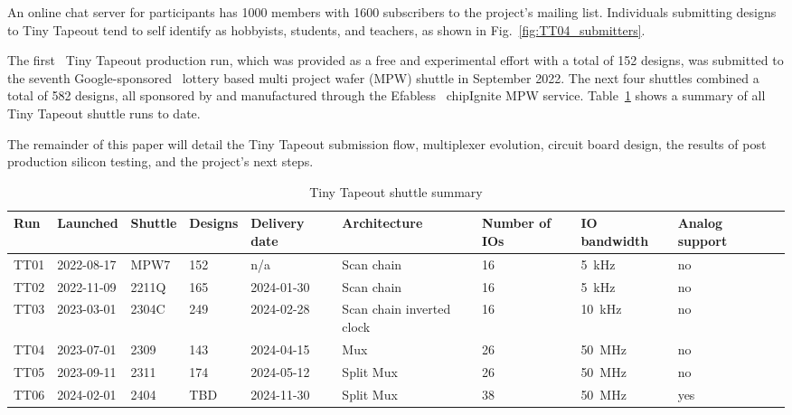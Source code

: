 An online chat server for participants has 1000 members with 1600 subscribers to the project's mailing list. Individuals submitting designs to Tiny Tapeout tend to self identify as hobbyists, students, and teachers, as shown in Fig.~\ref{fig:TT04_submitters}.

The first~\cite{firstshuttle} Tiny Tapeout production run, which was provided as a free and experimental effort with a total of 152 designs, was submitted to the seventh Google-sponsored~\cite{googlesponsored} lottery based multi project wafer (MPW) shuttle in September 2022.
The next four shuttles combined a total of 582 designs, all sponsored by and manufactured through the Efabless~\cite{efabless} chipIgnite MPW service. Table~\ref{tab:tinytapeout} shows a summary of all Tiny Tapeout shuttle runs to date.

The remainder of this paper will detail the Tiny Tapeout submission flow, multiplexer evolution, circuit board design, the results of post production silicon testing, and the project's next steps.

\begin{table}[!t]
\centering
\caption{Tiny Tapeout shuttle summary}
\label{tab:tinytapeout}
\begin{tabularx}{\textwidth}{@{}l *{9}{X}@{}}
\toprule
\textbf{Run} & \textbf{Launched} & \textbf{Shuttle} & \textbf{Designs} & \textbf{Delivery date} & \textbf{Architecture} & \textbf{Number of IOs} & \textbf{IO bandwidth} & \textbf{Analog support} \\
\midrule
TT01 & 2022-08-17  & MPW7  & 152 & n/a        & Scan chain                & 16 & \qty{5}{\kHz}    & no  \\
TT02 & 2022-11-09  & 2211Q & 165 & 2024-01-30 & Scan chain                & 16 & \qty{5}{\kHz}    & no  \\
TT03 & 2023-03-01  & 2304C & 249 & 2024-02-28 & Scan chain inverted clock & 16 & \qty{10}{\kHz}    & no  \\
TT04 & 2023-07-01  & 2309  & 143 & 2024-04-15 & Mux                       & 26 & \qty{50}{\MHz}   & no  \\
TT05 & 2023-09-11  & 2311  & 174 & 2024-05-12 & Split Mux                 & 26 & \qty{50}{\MHz}   & no  \\
TT06 & 2024-02-01  & 2404  & TBD & 2024-11-30 & Split Mux                 & 38 & \qty{50}{\MHz}   & yes \\
\bottomrule
\end{tabularx}
\end{table}

